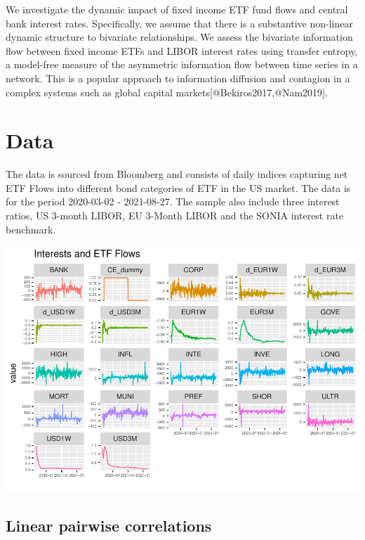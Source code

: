 \documentclass[
]{article}
\begin{document}
We investigate the dynamic impact of fixed income ETF fund flows and
central bank interest rates. Specifically, we assume that there is a
substantive non-linear dynamic structure to bivariate relationships. We
assess the bivariate information flow between fixed income ETFs and
LIBOR interest rates using transfer entropy, a model-free measure of the
asymmetric information flow between time series in a network. This is a
popular approach to information diffusion and contagion in a complex
systems such as global capital markets{[}@Bekiros2017,@Nam2019{]}.

\hypertarget{data}{%
\section{Data}\label{data}}

The data is sourced from Bloomberg and consists of daily indices
capturing net ETF Flows into different bond categories of ETF in the US
market. The data is for the period 2020-03-02 - 2021-08-27. The sample
also include three interest ratios, US 3-month LIBOR, EU 3-Month LIBOR
and the SONIA interest rate benchmark.

\includegraphics{working_paper_files/figure-latex/plot-1.pdf}

\hypertarget{linear-pairwise-correlations}{%
\subsection{Linear pairwise
correlations}\label{linear-pairwise-correlations}}
\end{document}
